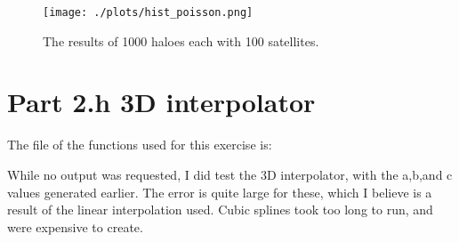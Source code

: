 \begin{figure}[h!]
  \centering
  \texttt{[image: ./plots/hist\_poisson.png]}
  \caption{The results of 1000 haloes each with 100 satellites. }
  \label{fig:hist_poisson}
\end{figure}

\section{Part 2.h 3D interpolator}

The file of the functions used for this exercise is:



While no output was requested, I did test the 3D interpolator, with the a,b,and c values generated earlier.
The error is quite large for these, which I believe is a result of the linear interpolation used. Cubic splines took too
long to run, and were expensive to create.





